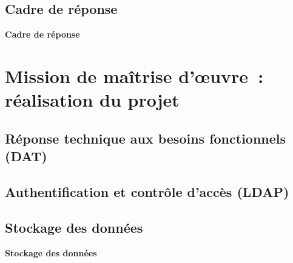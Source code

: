 \documentclass[10pt,fleqn]{beamer}
\begin{document}
\subsection{Cadre de réponse}
\begin{frame}
\begin{block}{\vspace{1cm}\begin{center}\textbf{Cadre de réponse} \end{center}\vspace{1cm}}
\end{block}
\end{frame}

\section[Mission de maîtrise d'œuvre~: réalisation du projet]{Mission de maîtrise d'œuvre~: réalisation du projet}


\subsection[Réponse technique aux besoins fonctionnels (DAT)]{Réponse technique aux besoins fonctionnels (DAT)}

\subsection[Authentification et contrôle d'accès (LDAP)]{Authentification et contrôle d'accès (LDAP)}
\begin{frame}
\tableofcontents[subsectionstyle=show/shaded/hide, subsubsectionstyle=hide, sectionstyle=show/hide]
\end{frame}




\subsection[Stockage des données]{Stockage des données}
\begin{frame}
\tableofcontents[subsectionstyle=show/shaded/hide, subsubsectionstyle=hide, sectionstyle=show/hide]
\end{frame}

\begin{frame}
\begin{block}{\vspace{1cm}\begin{center}\textbf{Stockage des données}\end{center}\vspace{1cm}}
\end{block}
\end{frame}
\end{document}
